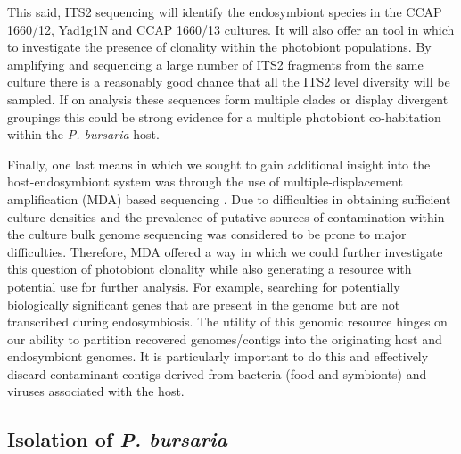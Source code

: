 This said, ITS2 sequencing will identify the endosymbiont species in
the CCAP 1660/12, Yad1g1N and CCAP 1660/13 cultures. It will also offer an
tool in which to investigate the presence of clonality within the
photobiont populations.  By amplifying and sequencing a large number of 
ITS2 fragments from the same culture there is a reasonably
good chance that all the ITS2 level diversity will be sampled. 
If on analysis these sequences form multiple clades or 
display divergent groupings this could be strong evidence
for a multiple photobiont co-habitation within the \textit{P. bursaria}
host.  


Finally, one last means in which we sought to
gain additional insight into the host-endosymbiont
system was through the use of multiple-displacement amplification (MDA)
based sequencing \citep{Lasken2007}.  
Due to difficulties in obtaining sufficient
culture densities and the prevalence of putative sources of contamination
within the culture bulk genome sequencing was considered to be prone to 
major difficulties.  Therefore, MDA offered a way in which 
we could further investigate this question of photobiont clonality
while also generating a resource with potential use for further analysis.
For example, searching for potentially biologically significant genes
that are 
present in the genome but are not transcribed during endosymbiosis.
The utility of this genomic resource hinges on our ability to 
partition recovered genomes/contigs into the originating host
and endosymbiont genomes.  It is particularly important to do this
and effectively discard contaminant contigs derived from 
bacteria (food and symbionts) and viruses associated with the host. 



%

\subsection{Isolation of \textit{P. bursaria}}

